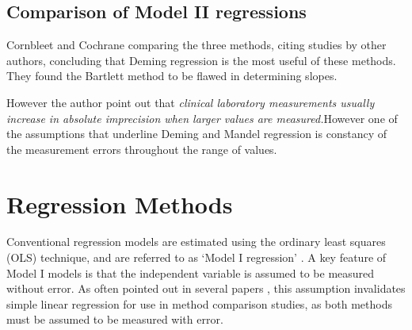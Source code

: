 \documentclass[12pt, a4paper]{report}
\theoremstyle{plain}
\theoremstyle{definition}
\theoremstyle{remark}
\begin{document}



\subsection{Comparison of Model II regressions}
Cornbleet and Cochrane comparing the three methods, citing studies by other authors, concluding that Deming regression is the most useful of these methods. They found the Bartlett method to be
flawed in determining slopes.

However the author point out that \emph{ clinical laboratory measurements usually increase in absolute imprecision when larger values are measured.}However one of the assumptions that underline Deming and Mandel regression is constancy of the measurement errors throughout the range of values.








\section{Regression Methods}
	Conventional regression models are estimated using the ordinary
	least squares (OLS) technique, and are referred to as `Model I
	regression' \citep{CornCoch,ludbrook97}. A key feature of Model I
	models is that the independent variable is assumed to be measured
	without error. As often pointed out in several papers
	\citep{BA83,ludbrook97}, this assumption invalidates simple linear
	regression for use in method comparison studies, as both methods
	must be assumed to be measured with error.
	
\end{document}
